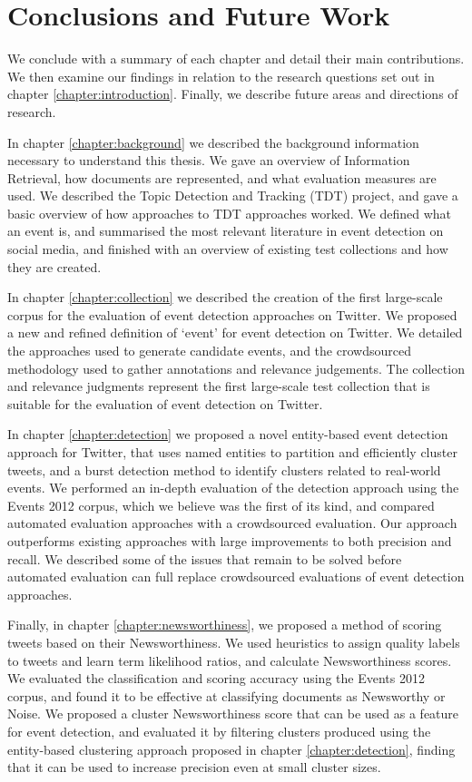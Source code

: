
\chapter{Conclusions and Future Work}
\label{chapter:Conclusion}
We conclude with a summary of each chapter and detail their main contributions. We then examine our findings in relation to the research questions set out in chapter \ref{chapter:introduction}. Finally, we describe future areas and directions of research.

In chapter \ref{chapter:background} we described the background information necessary to understand this thesis. We gave an overview of Information Retrieval, how documents are represented, and what evaluation measures are used.
We described the Topic Detection and Tracking (TDT) project, and gave a basic overview of how approaches to TDT approaches worked.
We defined what an event is, and summarised the most relevant literature in event detection on social media, and finished with an overview of existing test collections and how they are created.

In chapter \ref{chapter:collection} we described the creation of the first large-scale corpus for the evaluation of event detection approaches on Twitter.
We  proposed a new and refined definition of `event' for event detection on Twitter.
We detailed the approaches used to generate candidate events, and the crowdsourced methodology used to gather annotations and relevance judgements.
The collection and relevance judgments represent the first large-scale test collection that is suitable for the evaluation of event detection on Twitter.

In chapter \ref{chapter:detection} we proposed a novel entity-based event detection approach for Twitter, that uses named entities to partition and efficiently cluster tweets, and a burst detection method to identify clusters related to real-world events.
We performed an in-depth evaluation of the detection approach using the Events 2012 corpus, which we believe was the first of its kind, and compared automated evaluation approaches with a crowdsourced evaluation.
Our approach outperforms existing approaches with large improvements to both precision and recall.
We described some of the issues that remain to be solved before automated evaluation can full replace crowdsourced evaluations of event detection approaches.

Finally, in chapter \ref{chapter:newsworthiness}, we proposed a method of scoring tweets based on their Newsworthiness.
We used heuristics to assign quality labels to tweets and learn term likelihood ratios, and calculate Newsworthiness scores.
We evaluated the classification and scoring accuracy using the Events 2012 corpus, and found it to be effective at classifying documents as Newsworthy or Noise.
We proposed a cluster Newsworthiness score that can be used as a feature for event detection, and evaluated it by filtering clusters produced using the entity-based clustering approach proposed in chapter \ref{chapter:detection}, finding that it can be used to increase precision even at small cluster sizes.

